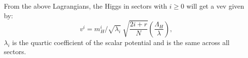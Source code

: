 \documentclass[nofootinbib,twocolumn,preprintnumbers]{revtex4-1}
\begin{document}
From the above Lagrangians, the Higgs in sectors with $i \geq 0$ will get a vev given by:
\begin{equation}\label{eqn:vevs}
v^i = m^i_H/\sqrt{\lambda_i} ~ \sqrt{\frac{2i + r}{N}}\left(\frac{\Lambda_H}{\lambda}\right),
\end{equation}
$\lambda_i$ is the quartic coefficient of the scalar potential and is the same across all sectors. 
%
%
%
%
%
%
\end{document}
